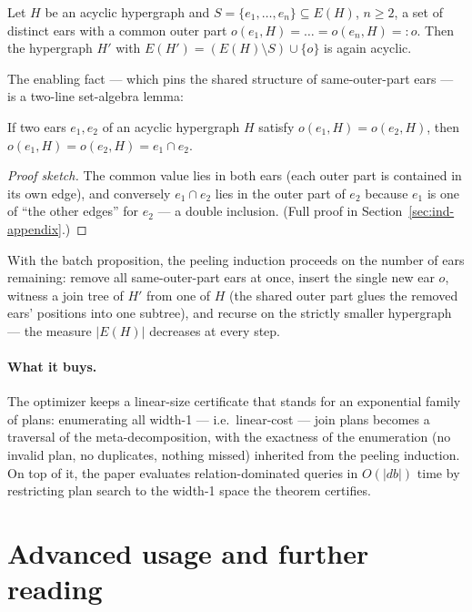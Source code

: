 \begin{proposition}\label{prop:ind-ears}
Let $H$ be an acyclic hypergraph and $S = \{e_1, \dots, e_n\} \subseteq E(H)$,
$n \ge 2$, a set of distinct ears with a common outer part
$o(e_1,H) = \dots = o(e_n,H) =: o$. Then the hypergraph $H'$ with
$E(H') = (E(H) \setminus S) \cup \{o\}$ is again acyclic. \eop
\end{proposition}

The enabling fact --- which pins the shared structure of same-outer-part ears --- is a
two-line set-algebra lemma:

\begin{lemma}\label{lem:ind-equal-outer}
If two ears $e_1, e_2$ of an acyclic hypergraph $H$ satisfy
$o(e_1,H) = o(e_2,H)$, then $o(e_1,H) = o(e_2,H) = e_1 \cap e_2$. \eop
\end{lemma}

\begin{proof}[Proof sketch]
The common value lies in both ears (each outer part is contained in its own edge), and
conversely $e_1 \cap e_2$ lies in the outer part of $e_2$ because $e_1$ is one of
``the other edges'' for $e_2$ --- a double inclusion. (Full proof in
Section~\ref{sec:ind-appendix}.)
\end{proof}

With the batch proposition, the peeling induction proceeds on the number of ears
remaining: remove all same-outer-part ears at once, insert the single new ear $o$,
witness a join tree of $H'$ from one of $H$ (the shared outer part glues the removed
ears' positions into one subtree), and recurse on the strictly smaller hypergraph ---
the measure $|E(H)|$ decreases at every step.

\paragraph{What it buys.}
The optimizer keeps a linear-size certificate that stands for an exponential family of
plans: enumerating all width-1 --- i.e.\ linear-cost --- join plans becomes a traversal
of the meta-decomposition, with the exactness of the enumeration (no invalid plan, no
duplicates, nothing missed) inherited from the peeling induction. On top of it, the
paper evaluates relation-dominated queries in $O(|db|)$ time by restricting plan
search to the width-1 space the theorem certifies.

\section{Advanced usage and further reading}
\label{sec:ind-advanced}

